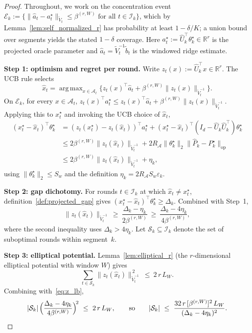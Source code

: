 \documentclass[11pt]{article}
\newcommand{\R}{\mathbb{R}}
\newcommand{\op}{\mathrm{op}}
\newcommand{\cA}{\mathcal{A}}
\newcommand{\cI}{\mathcal{I}}
\DeclareMathOperator*{\argmax}{arg\,max}
\begin{document}
\begin{proof}
Throughout, we work on the concentration event
$\mathcal{E}_k:=\{\|\widehat a_t-a_t^\star\|_{\widetilde V_t}\le
\beta^{(r,W)}\text{ for all }t\in\cI_k\}$, which by
Lemma~\ref{lem:self_normalized_r} has probability at least $1-\delta/K$;
a union bound over segments yields the stated $1-\delta$ coverage.
Here $a_t^\star:=\widehat U_{k}^\top\theta_k^\star\in\R^r$ is the
projected oracle parameter and
$\widehat a_t=\widetilde V_t^{-1}\widetilde b_t$ is the windowed ridge
estimate.

\textbf{Step 1: optimism and regret per round.}
Write $z_t(x):=\widehat U_k^\top x\in\R^r$.  The UCB rule selects
\[
  \widehat x_t
  =\argmax_{x\in\cA_t}\bigl\{z_t(x)^\top\widehat a_t+\beta^{(r,W)}\|z_t(x)\|_{\widetilde V_t^{-1}}\bigr\}.
\]
On $\mathcal{E}_k$, for every $x\in\cA_t$,
$z_t(x)^\top a_t^\star\le z_t(x)^\top\widehat a_t+\beta^{(r,W)}\|z_t(x)\|_{\widetilde V_t^{-1}}$.
Applying this to $x_t^\star$ and invoking the UCB choice of
$\widehat x_t$,
\begin{align*}
  (x_t^\star-\widehat x_t)^\top\theta_k^\star
  &=(z_t(x_t^\star)-z_t(\widehat x_t))^\top a_t^\star
    +(x_t^\star-\widehat x_t)^\top(I_d-\widehat U_k\widehat U_k^\top)\theta_k^\star\\
  &\le 2\beta^{(r,W)}\|z_t(\widehat x_t)\|_{\widetilde V_t^{-1}}
    +2R_{\cA}\|\theta_k^\star\|_2\|\widehat P_k-P_k^\star\|_{\op}\\
  &\le 2\beta^{(r,W)}\|z_t(\widehat x_t)\|_{\widetilde V_t^{-1}}
    +\eta_k,
\end{align*}
using $\|\theta_k^\star\|_2\le S_w$ and the definition
$\eta_k=2R_{\cA}S_w\varepsilon_k$.

\textbf{Step 2: gap dichotomy.}
For rounds $t\in\cI_k$ at which $\widehat x_t\neq x_t^\star$,
definition~\ref{def:projected_gap} gives
$(x_t^\star-\widehat x_t)^\top\theta_k^\star\ge\Delta_k$.
Combined with Step~1,
\begin{equation}
  \|z_t(\widehat x_t)\|_{\widetilde V_t^{-1}}
  \ \ge\ \frac{\Delta_k-\eta_k}{2\beta^{(r,W)}}
  \ \ge\ \frac{\Delta_k-4\eta_k}{4\beta^{(r,W)}},
  \label{eq:z_lb}
\end{equation}
where the second inequality uses $\Delta_k>4\eta_k$.
Let $\mathcal{S}_k\subseteq\cI_k$ denote the set of suboptimal rounds
within segment~$k$.

\textbf{Step 3: elliptical potential.}
Lemma~\ref{lem:elliptical_r} (the $r$-dimensional elliptical
potential with window $W$) gives
\[
  \sum_{t\in\mathcal{S}_k}\|z_t(\widehat x_t)\|_{\widetilde V_t^{-1}}^{\,2}
  \ \le\ 2\,r\,L_W.
\]
Combining with~\eqref{eq:z_lb},
\begin{equation}
  |\mathcal{S}_k|\,\Bigl(\frac{\Delta_k-4\eta_k}{4\beta^{(r,W)}}\Bigr)^{\!2}
  \ \le\ 2\,r\,L_W,
  \qquad\text{so}\qquad
  |\mathcal{S}_k|\ \le\ \frac{32\,r\,[\beta^{(r,W)}]^2\,L_W}{(\Delta_k-4\eta_k)^2}.
  \label{eq:subopt_count}
\end{equation}


\end{proof}
\end{document}
